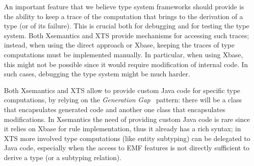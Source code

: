 An important feature that we believe type system frameworks should provide is
the ability to keep a trace of the computation that brings to the derivation of
a type (or of its failure).  This is crucial both for debugging and for testing
the type system.  Both Xsemantics and XTS provide mechanisms for accessing such
traces; instead, when using the direct approach or Xbase, keeping the traces of
type computations must be implemented manually.  In particular, when using
Xbase, this might not be possible since it would require modification of
internal code.  In such cases, debugging the type system might be much harder.

Both Xsemantics and XTS allow to provide custom Java code for specific type
computations, by relying on the \emph{Generation Gap}~\cite{Vlissides:1996:GGS}
pattern: there will be a class that encapsulates generated code and another one
class that encapsulates modifications.  In Xsemantics the need of providing
custom Java code is rare since it relies on Xbase for rule implementation, thus
it already has a rich syntax; in XTS more involved type computations (like
entity subtyping) can be delegated to Java code, especially when the access to
EMF features is not directly sufficient to derive a type (or a subtyping
relation).
